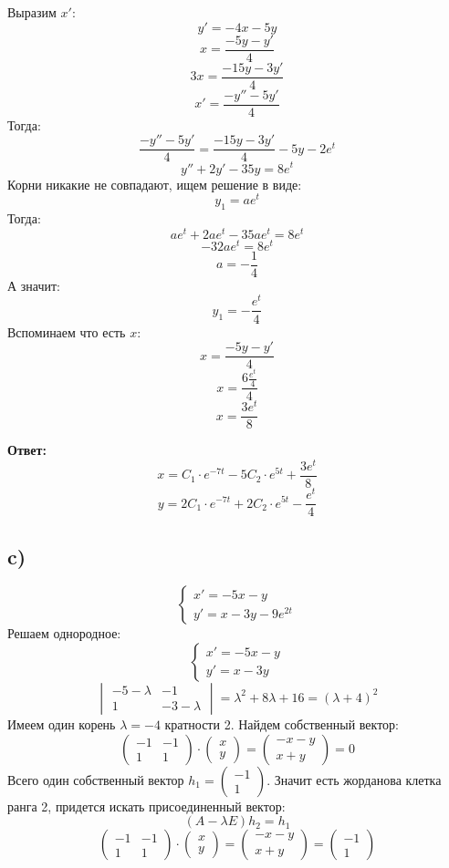 \documentclass[a4paper,12pt]{article}
\begin{document}
Выразим $x'$:
\[
y' = -4x -5 y
\]
\[
x = \frac{-5y-y' }{4}
\]
\[
3x = \frac{-15y-3y' }{4}
\]
\[
x' = \frac{-y'' - 5y'}{4}
\]
Тогда:
\[
\frac{-y'' - 5y'}{4} = \frac{-15y-3y' }{4} -5y - 2e^t
\]
\[
y'' + 2y' - 35y = 8e^t
\]
Корни никакие не совпадают, ищем решение в виде:
\[
y_1 = a e^t
\]
Тогда:
\[
a e^t + 2ae^t - 35ae^t = 8e^t
\]
\[
-32 ae^t = 8e^t
\]
\[
a = - \frac{1}{4}
\]
А значит:
\[
y_1 = - \frac{e^t}{4}
\]
Вспоминаем что есть $x$:
\[
x = \frac{-5y-y' }{4}
\]
\[
x  = \frac{6\frac{e^t}{4}}{4}
\]
\[
x = \frac{3e^t}{8}
\]
\begin{center}
\textbf{Ответ: } 
\[
x = C_1 \cdot e^{-7t} - 5C_2 \cdot e^{5t} + \frac{3e^t}{8}
\]
\[
y = 2C_1 \cdot e^{-7t} + 2C_2 \cdot e^{5t} - \frac{e^t}{4}
\]
\end{center}
\clearpage
\subsection*{c)}
\[
\begin{cases}
x' = -5x - y\\
y' = x -3y -9e^{2t}
\end{cases}
\]
Решаем однородное:
\[
\begin{cases}
x' = -5x - y\\
y' = x -3y
\end{cases}
\]
\[
\begin{vmatrix}
-5 - \lambda& -1 \\
1 & -3 - \lambda 
\end{vmatrix}
= \lambda^2 + 8\lambda + 16 = (\lambda  +4)^2
\]
Имеем один корень $\lambda = -4$ кратности 2. Найдем собственный вектор:
\[
\begin{pmatrix}
-1 & -1 \\
1 & 1
\end{pmatrix}
\cdot
\begin{pmatrix}
x \\ y
\end{pmatrix}
=
\begin{pmatrix}
-x-y \\
x + y
\end{pmatrix}
=
0
\]
Всего один собственный вектор $h_1 = \begin{pmatrix}
-1 \\ 1
\end{pmatrix}$. Значит есть жорданова клетка ранга 2, придется искать присоединенный вектор:
\[
(A - \lambda E) h_2 = h_1
\]
\[
\begin{pmatrix}
-1 & -1 \\
1 & 1
\end{pmatrix}
\cdot
\begin{pmatrix}
x \\ y
\end{pmatrix}
=
\begin{pmatrix}
-x-y \\
x + y
\end{pmatrix}
=
\begin{pmatrix}
-1 \\ 1
\end{pmatrix}
\]
\end{document}
